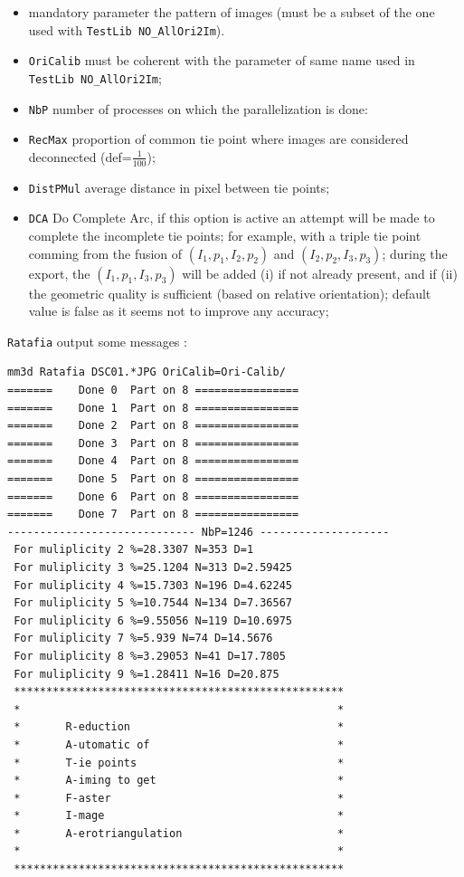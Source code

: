 \begin{itemize}
   \item mandatory parameter the pattern of images (must be a subset of the one used with {\tt TestLib NO\_AllOri2Im}).

   \item  {\tt OriCalib} must be coherent with the parameter of same name used in {\tt TestLib NO\_AllOri2Im};

   \item  {\tt NbP} number of processes on which the parallelization is done:

   \item  {\tt RecMax} proportion of common tie point where images are considered deconnected (def=$\frac{1}{100}$);

   \item  {\tt DistPMul} average distance in pixel between tie points;

   \item  {\tt DCA} Do Complete Arc, if this option is active an attempt will be made to complete the incomplete
          tie points; for example, with a triple tie point comming from the fusion of $(I_1,p_1,I_2,p_2)$ and
          $(I_2,p_2,I_3,p_3)$; during the export, the $(I_1,p_1,I_3,p_3)$ will be added (i) if not already present, and if (ii)
          the geometric quality is sufficient (based on relative orientation); default value is false as it 
          seems not to improve any accuracy;
\end{itemize}


{\tt Ratafia} output some messages :

\begin{verbatim}
mm3d Ratafia DSC01.*JPG OriCalib=Ori-Calib/
=======    Done 0  Part on 8 ================
=======    Done 1  Part on 8 ================
=======    Done 2  Part on 8 ================
=======    Done 3  Part on 8 ================
=======    Done 4  Part on 8 ================
=======    Done 5  Part on 8 ================
=======    Done 6  Part on 8 ================
=======    Done 7  Part on 8 ================
----------------------------- NbP=1246 --------------------
 For muliplicity 2 %=28.3307 N=353 D=1
 For muliplicity 3 %=25.1204 N=313 D=2.59425
 For muliplicity 4 %=15.7303 N=196 D=4.62245
 For muliplicity 5 %=10.7544 N=134 D=7.36567
 For muliplicity 6 %=9.55056 N=119 D=10.6975
 For muliplicity 7 %=5.939 N=74 D=14.5676
 For muliplicity 8 %=3.29053 N=41 D=17.7805
 For muliplicity 9 %=1.28411 N=16 D=20.875
 ***************************************************
 *                                                 *
 *       R-eduction                                *
 *       A-utomatic of                             *
 *       T-ie points                               *
 *       A-iming to get                            *
 *       F-aster                                   *
 *       I-mage                                    *
 *       A-erotriangulation                        *
 *                                                 *
 ***************************************************
\end{verbatim}

